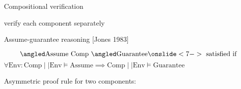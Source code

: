 \documentclass[../talk.tex]{subfiles}
\begin{document}
\begin{frame}{Compositional verification}
\begin{overlayarea}{\slidewidth}{\slideheight}
{{                    \quad verify each component separately
                }
            }
            {%
                \vspace*{-0.5em}
                \alert{Assume-guarantee reasoning} [Jones 1983]

                {%
                    \vspace*{-1em}
                    \[
                        \relyguarantee{\text{Assume}}{\text{Comp}}{\text{Guarantee}}%
                        \onslide<7->{\text{\ satisfied if}}
                    \]
                    {%
                        \(
                            \forall \text{Env} \colon \text{Comp} \!\mid\mid\! \text{Env} \models \text{Assume}
                            \implies
                            \text{Comp} \!\mid\mid\! \text{Env} \models \text{Guarantee}
                        \)
                    }
                }
                {%
                    \vspace*{1em}

                    Asymmetric \alert{proof rule} for two components:

}}
\end{overlayarea}
\end{frame}
\end{document}
